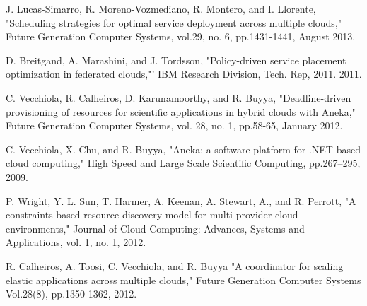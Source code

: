 \documentclass[conference]{IEEEtran}
\begin{document}
\begin{thebibliography}{4}
 J. Lucas-Simarro, R. Moreno-Vozmediano, R. Montero, and I. Llorente, "Scheduling strategies for optimal service deployment across multiple clouds," Future Generation Computer Systems, vol.29, no. 6, pp.1431-1441, August 2013. 

 D. Breitgand, A. Marashini, and J. Tordsson, "Policy-driven service placement optimization in federated clouds,"' IBM Research Division, Tech. Rep, 2011.
 2011.

C. Vecchiola, R. Calheiros, D. Karunamoorthy, and R. Buyya, "Deadline-driven provisioning of resources for scientific applications in hybrid clouds with
 Aneka," Future Generation Computer Systems, vol. 28, no. 1, pp.58-65, January 2012.

C. Vecchiola, X. Chu, and R. Buyya, "Aneka: a software platform for .NET-based cloud computing," High Speed and Large Scale Scientific Computing, pp.267--295, 2009.

P. Wright, Y. L. Sun, T. Harmer, A. Keenan, A. Stewart, A., and  R. Perrott, "A constraints-based resource discovery model for multi-provider cloud environments," Journal of Cloud Computing: Advances, Systems and Applications, vol. 1, no. 1, 2012.

 R. Calheiros, A. Toosi, C. Vecchiola, and R. Buyya "A coordinator for scaling elastic applications across multiple clouds," Future Generation Computer Systems Vol.28(8), pp.1350-1362, 2012.


 \end{thebibliography}
\end{document}
